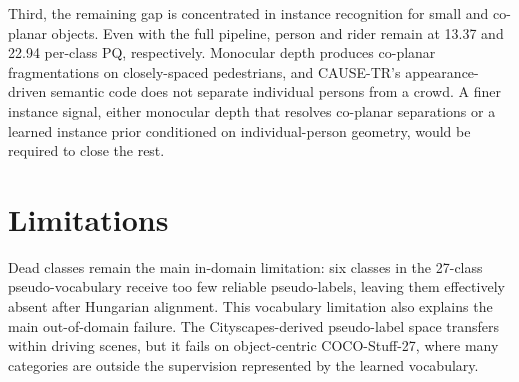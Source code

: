 \documentclass[10pt,twocolumn,letterpaper]{article}
\begin{document}
Third, the remaining gap is concentrated in instance recognition for small and co-planar objects. Even with the full pipeline, person and rider remain at 13.37 and 22.94 per-class PQ, respectively. Monocular depth produces co-planar fragmentations on closely-spaced pedestrians, and CAUSE-TR's appearance-driven semantic code does not separate individual persons from a crowd. A finer instance signal, either monocular depth that resolves co-planar separations or a learned instance prior conditioned on individual-person geometry, would be required to close the rest.


\section{Limitations}
\label{sec:limitations}

\noindent Dead classes remain the main in-domain limitation: six classes in the 27-class pseudo-vocabulary receive too few reliable pseudo-labels, leaving them effectively absent after Hungarian alignment. This vocabulary limitation also explains the main out-of-domain failure. The Cityscapes-derived pseudo-label space transfers within driving scenes, but it fails on object-centric COCO-Stuff-27, where many categories are outside the supervision represented by the learned vocabulary.
\end{document}
